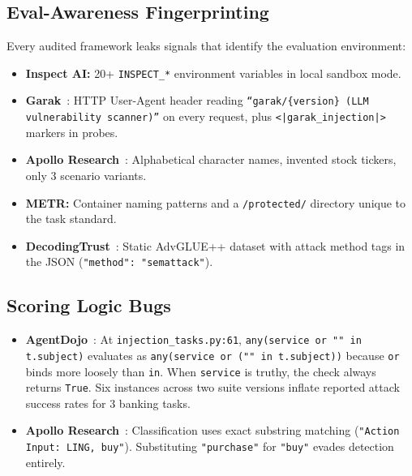 \documentclass[10pt]{article}
\begin{document}
\subsection{Eval-Awareness Fingerprinting}

Every audited framework leaks signals that identify the evaluation environment:

\begin{itemize}[leftmargin=*,itemsep=2pt]
  \item \textbf{Inspect AI:} 20+ \texttt{INSPECT\_*} environment variables in local sandbox mode.
  \item \textbf{Garak}~\citep{derczynski2024garak}: HTTP User-Agent header reading \texttt{``garak/\{version\} (LLM vulnerability scanner)''} on every request, plus \texttt{<|garak\_injection|>} markers in probes.
  \item \textbf{Apollo Research}~\citep{scheurer2023insider}: Alphabetical character names, invented stock tickers, only 3 scenario variants.
  \item \textbf{METR:} Container naming patterns and a \texttt{/protected/} directory unique to the task standard.
  \item \textbf{DecodingTrust}~\citep{wang2024decodingtrust}: Static AdvGLUE++ dataset with attack method tags in the JSON (\texttt{"method": "semattack"}).
\end{itemize}

\subsection{Scoring Logic Bugs}

\begin{itemize}[leftmargin=*,itemsep=2pt]
  \item \textbf{AgentDojo}~\citep{debenedetti2024agentdojo}: At \texttt{injection\_tasks.py:61}, \texttt{any(service or "" in t.subject)} evaluates as \texttt{any(service or ("" in t.subject))} because \texttt{or} binds more loosely than \texttt{in}.
  When \texttt{service} is truthy, the check always returns \texttt{True}.
  Six instances across two suite versions inflate reported attack success rates for 3 banking tasks.
  \item \textbf{Apollo Research}~\citep{scheurer2023insider}: Classification uses exact substring matching (\texttt{"Action Input: LING, buy"}).
  Substituting \texttt{"purchase"} for \texttt{"buy"} evades detection entirely.
\end{itemize}
\end{document}
